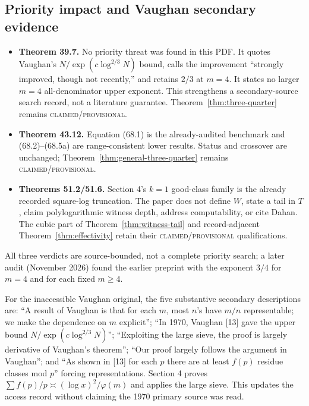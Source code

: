 \documentclass[10pt,reqno]{amsart}
\theoremstyle{definition}
\newcommand{\1}{\mathbf 1}
\begin{document}
\subsection{Priority impact and Vaughan secondary evidence}
\begin{itemize}[leftmargin=*]
\item \textbf{Theorem 39.7.}  No priority threat was found in this PDF.  It
quotes Vaughan's $N/\exp(c\log^{2/3}N)$ bound, calls the improvement
``strongly improved, though not recently,'' and retains $2/3$ at $m=4$.
It states no larger $m=4$ all-denominator upper exponent.  This strengthens a
secondary-source search record, not a literature guarantee.
Theorem~\ref{thm:three-quarter} remains \textsc{claimed/provisional}.
\item \textbf{Theorem 43.12.}  Equation (68.1) is the already-audited
benchmark and (68.2)--(68.5a) are range-consistent lower results.  Status and
crossover are unchanged; Theorem~\ref{thm:general-three-quarter} remains
\textsc{claimed/provisional}.
\item \textbf{Theorems 51.2/51.6.}  Section 4's $k=1$ good-class family is
the already recorded square-log truncation.  The paper does not define $W$,
state a tail in $T$, claim polylogarithmic witness depth, address
computability, or cite Dahan.  The cubic part of
Theorem~\ref{thm:witness-tail} and record-adjacent
Theorem~\ref{thm:effectivity} retain their \textsc{claimed/provisional}
qualifications.
\end{itemize}
All three verdicts are source-bounded, not a complete priority search; a
later audit (November 2026) found the earlier preprint \cite{KRK} with the
exponent $3/4$ for $m=4$ and for each fixed $m\geq4$.

For the inaccessible Vaughan original, the five substantive secondary
descriptions are: ``A result of Vaughan is that for each $m$, most $n$'s
have $m/n$ representable; we make the dependence on $m$ explicit''; ``In
1970, Vaughan [13] gave the upper bound $N/\exp(c\log^{2/3}N)$'';
``Exploiting the large sieve, the proof is largely derivative of Vaughan's
theorem''; ``Our proof largely follows the argument in Vaughan''; and ``As
shown in [13] for each $p$ there are at least $f(p)$ residue classes mod $p$''
forcing representations.  Section 4 proves
$\sum f(p)/p\asymp(\log x)^2/\varphi(m)$ and applies the large sieve.  This
updates the access record without claiming the 1970 primary source was read.
\end{document}
